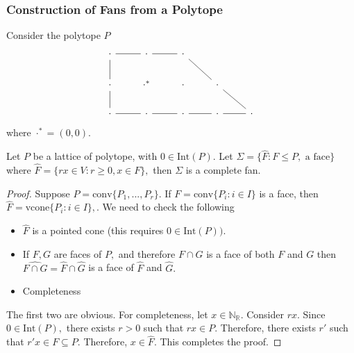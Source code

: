 \documentclass[a4paper,12pt]{amsart}
\newcommand{\R}{\ensuremath{\mathbb{R}}}
\newcommand{\N}{\mathbb{N}}
\begin{document}
\subsubsection*{Construction of Fans from a Polytope}
\begin{example}
	Consider the polytope $P$ \[ \begin{tikzcd}
	\cdot \arrow[r,dash] \arrow[d,dash] & \cdot \arrow[r, dash] & \cdot\arrow[rd,dash]&&\\
		\cdot \arrow[d,dash] &	\cdot^*  &\cdot   &\cdot  \arrow[rd,dash]&\\
	\cdot \arrow[r,dash]&\cdot \arrow[r,dash]&\cdot \arrow[r,dash]&\cdot \arrow[r,dash]&\cdot
	\end{tikzcd}    \]
	where $\cdot^*=(0,0).$ 
\end{example}
\begin{proposition}
	Let $P$ be a lattice of polytope, with $0\in \text{Int}(P).$ Let $\Sigma=\{ \hat{F}:F\leq P, \text{ a face}   \}$ where $\hat{F}=\{ rx\in V:r\geq 0,x\in F   \},$ then $\Sigma$ is a complete fan. 
\end{proposition}
\begin{proof}
	Suppose $P=\text{conv}\{P_1,...,P_r\}.$ If $F=\text{conv}\{P_i:i\in I\}$ is a face, then $\hat{F}=\text{vcone}\{ P_i:i\in I  \},.$ We need to check the following \begin{itemize}
		\item $\hat{F}$ is a pointed cone (this requires $0\in \text{Int}(P)).$
		\item If $F,G$ are faces of $P,$ and therefore $F\cap G$ is a face of both $F$ and $G$ then $\widehat{F\cap G}=\hat{F}\cap \hat{G}$ is a face of $\hat{F}$ and $\hat{G}.$	
		\item Completeness
	\end{itemize} 
The first two are obvious. For completeness, let $x\in \N_\R.$ Consider $rx.$ Since $0\in \text{Int}(P),$ there exists $r>0$ such that $rx\in P.$ Therefore, there exists $r'$ such that $r'x\in F\subseteq P.$ Therefore, $x\in \hat{F}.$ This completes the proof.    
\end{proof}
\end{document}
